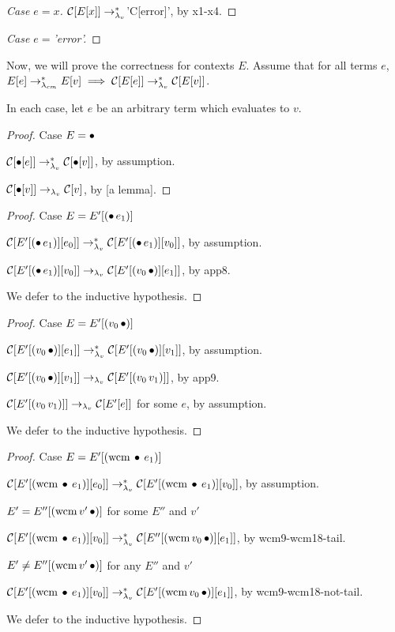 \begin{proof}[Case $e=x$]
$\mathcal{C}[E[x]]\rightarrow_{\lambda_v}^{*}$\scheme'C[error]', by x1-x4.
\end{proof}

\begin{proof}[Case $e=$\scheme'error']
\end{proof}

Now, we will prove the correctness for contexts $E$. Assume that for all terms $e$,
$E[e]\rightarrow_{\lambda_{cm}}^{*} E[v]\implies\mathcal{C}[E[e]]\rightarrow_{\lambda_v}^{*} \mathcal{C}[E[v]]$.

In each case, let $e$ be an arbitrary term which evaluates to $v$.

\begin{proof}{Case $E=\bullet$}

$\mathcal{C}[\bullet[e]]\rightarrow_{\lambda_v}^{*}\mathcal{C}[\bullet[v]]$, by assumption.

$\mathcal{C}[\bullet[v]]\rightarrow_{\lambda_v}\mathcal{C}[v]$, by [a lemma].
\end{proof}

\begin{proof}{Case $E=E'[(\bullet\,e_1)]$}

$\mathcal{C}[E'[(\bullet\,e_1)][e_0]]\rightarrow_{\lambda_v}^{*}\mathcal{C}[E'[(\bullet\,e_1)][v_0]]$, by assumption.

$\mathcal{C}[E'[(\bullet\,e_1)][v_0]]\rightarrow_{\lambda_v}\mathcal{C}[E'[(v_0\,\bullet)][e_1]]$, by app8.

We defer to the inductive hypothesis.
\end{proof}

\begin{proof}{Case $E=E'[(v_0\,\bullet)]$}

$\mathcal{C}[E'[(v_0\,\bullet)][e_1]]\rightarrow_{\lambda_v}^{*}\mathcal{C}[E'[(v_0\,\bullet)][v_1]]$, by assumption.

$\mathcal{C}[E'[(v_0\,\bullet)][v_1]]\rightarrow_{\lambda_v}\mathcal{C}[E'[(v_0\,v_1)]]$, by app9.

$\mathcal{C}[E'[(v_0\,v_1)]]\rightarrow_{\lambda_v}\mathcal{C}[E'[e]]$ for some $e$, by assumption.

We defer to the inductive hypothesis.
\end{proof}

\begin{proof}{Case $E=E'[(\mathrm{wcm}\,\bullet\,e_1)]$}

$\mathcal{C}[E'[(\mathrm{wcm}\,\bullet\,e_1)][e_0]]\rightarrow_{\lambda_v}^{*}\mathcal{C}[E'[(\mathrm{wcm}\,\bullet\,e_1)][v_0]]$, by assumption.

\begin{case}{$E'=E''[(\mathrm{wcm}\,v'\,\bullet)]$ for some $E''$ and $v'$}

$\mathcal{C}[E'[(\mathrm{wcm}\,\bullet\,e_1)][v_0]]\rightarrow_{\lambda_v}^{*}\mathcal{C}[E''[(\mathrm{wcm}\,v_0\,\bullet)][e_1]]$, by wcm9-wcm18-tail.
\end{case}

\begin{case}{$E'\ne E''[(\mathrm{wcm}\,v'\,\bullet)]$ for any $E''$ and $v'$}

$\mathcal{C}[E'[(\mathrm{wcm}\,\bullet\,e_1)][v_0]]\rightarrow_{\lambda_v}^{*}\mathcal{C}[E'[(\mathrm{wcm}\,v_0\,\bullet)][e_1]]$, by wcm9-wcm18-not-tail.
\end{case}

We defer to the inductive hypothesis.
\end{proof}

